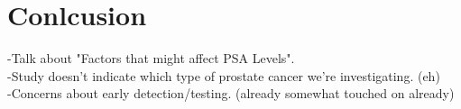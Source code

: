 
\section{Conlcusion}

-Talk about "Factors that might affect PSA Levels". \\
-Study doesn't indicate which type of prostate cancer we're investigating. (eh) \\
-Concerns about early detection/testing. (already somewhat touched on already)
